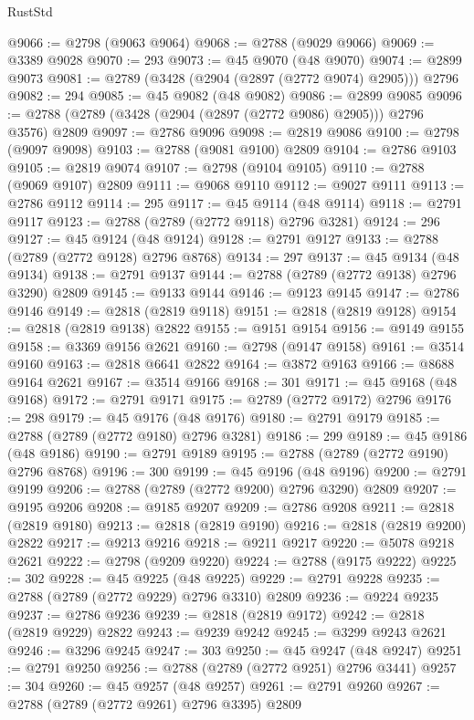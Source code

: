 \begin{lexlean}{RustStd}
\begin{coremodule}
@9066 := @2798 (@9063 @9064)
@9068 := @2788 (@9029 @9066)
@9069 := @3389 @9028
@9070 := 293
@9073 := @45 @9070 (@48 @9070)
@9074 := @2899 @9073
@9081 := @2789 (@3428 (@2904 (@2897 (@2772 @9074) @2905))) @2796
@9082 := 294
@9085 := @45 @9082 (@48 @9082)
@9086 := @2899 @9085
@9096 := @2788 (@2789 (@3428 (@2904 (@2897 (@2772 @9086) @2905))) @2796 @3576) @2809
@9097 := @2786 @9096
@9098 := @2819 @9086
@9100 := @2798 (@9097 @9098)
@9103 := @2788 (@9081 @9100) @2809
@9104 := @2786 @9103
@9105 := @2819 @9074
@9107 := @2798 (@9104 @9105)
@9110 := @2788 (@9069 @9107) @2809
@9111 := @9068 @9110
@9112 := @9027 @9111
@9113 := @2786 @9112
@9114 := 295
@9117 := @45 @9114 (@48 @9114)
@9118 := @2791 @9117
@9123 := @2788 (@2789 (@2772 @9118) @2796 @3281)
@9124 := 296
@9127 := @45 @9124 (@48 @9124)
@9128 := @2791 @9127
@9133 := @2788 (@2789 (@2772 @9128) @2796 @8768)
@9134 := 297
@9137 := @45 @9134 (@48 @9134)
@9138 := @2791 @9137
@9144 := @2788 (@2789 (@2772 @9138) @2796 @3290) @2809
@9145 := @9133 @9144
@9146 := @9123 @9145
@9147 := @2786 @9146
@9149 := @2818 (@2819 @9118)
@9151 := @2818 (@2819 @9128)
@9154 := @2818 (@2819 @9138) @2822
@9155 := @9151 @9154
@9156 := @9149 @9155
@9158 := @3369 @9156 @2621
@9160 := @2798 (@9147 @9158)
@9161 := @3514 @9160
@9163 := @2818 @6641 @2822
@9164 := @3872 @9163
@9166 := @8688 @9164 @2621
@9167 := @3514 @9166
@9168 := 301
@9171 := @45 @9168 (@48 @9168)
@9172 := @2791 @9171
@9175 := @2789 (@2772 @9172) @2796
@9176 := 298
@9179 := @45 @9176 (@48 @9176)
@9180 := @2791 @9179
@9185 := @2788 (@2789 (@2772 @9180) @2796 @3281)
@9186 := 299
@9189 := @45 @9186 (@48 @9186)
@9190 := @2791 @9189
@9195 := @2788 (@2789 (@2772 @9190) @2796 @8768)
@9196 := 300
@9199 := @45 @9196 (@48 @9196)
@9200 := @2791 @9199
@9206 := @2788 (@2789 (@2772 @9200) @2796 @3290) @2809
@9207 := @9195 @9206
@9208 := @9185 @9207
@9209 := @2786 @9208
@9211 := @2818 (@2819 @9180)
@9213 := @2818 (@2819 @9190)
@9216 := @2818 (@2819 @9200) @2822
@9217 := @9213 @9216
@9218 := @9211 @9217
@9220 := @5078 @9218 @2621
@9222 := @2798 (@9209 @9220)
@9224 := @2788 (@9175 @9222)
@9225 := 302
@9228 := @45 @9225 (@48 @9225)
@9229 := @2791 @9228
@9235 := @2788 (@2789 (@2772 @9229) @2796 @3310) @2809
@9236 := @9224 @9235
@9237 := @2786 @9236
@9239 := @2818 (@2819 @9172)
@9242 := @2818 (@2819 @9229) @2822
@9243 := @9239 @9242
@9245 := @3299 @9243 @2621
@9246 := @3296 @9245
@9247 := 303
@9250 := @45 @9247 (@48 @9247)
@9251 := @2791 @9250
@9256 := @2788 (@2789 (@2772 @9251) @2796 @3441)
@9257 := 304
@9260 := @45 @9257 (@48 @9257)
@9261 := @2791 @9260
@9267 := @2788 (@2789 (@2772 @9261) @2796 @3395) @2809

\end{coremodule}
\end{lexlean}
